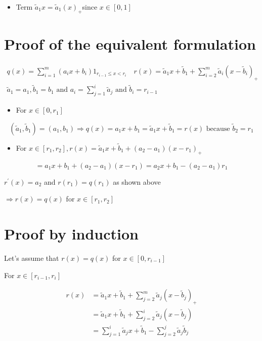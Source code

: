 \documentclass[10pt]{article}
\begin{document}
\begin{itemize}
  \item Term $\tilde{a}_{1} x=\tilde{a}_{1}(x)_{+}$since $x \in[0,1]$
\end{itemize}

\section*{Proof of the equivalent formulation}
$$
\begin{gathered}
q(x)=\sum_{i=1}^{m}\left(a_{i} x+b_{i}\right) 1_{r_{i-1} \leq x<r_{i}} \quad r(x)=\tilde{a}_{1} x+\tilde{b}_{1}+\sum_{i=2}^{m} \tilde{a}_{i}\left(x-\tilde{b}_{i}\right)_{+} \\
\tilde{a}_{1}=a_{1}, \tilde{b}_{1}=b_{1} \text { and } a_{i}=\sum_{j=1}^{i} \tilde{a}_{j} \text { and } \tilde{b}_{i}=r_{i-1}
\end{gathered}
$$

\begin{itemize}
  \item For $x \in\left[0, r_{1}\right]$
\end{itemize}

$$
\left(\tilde{a}_{1}, \tilde{b}_{1}\right)=\left(a_{1}, b_{1}\right) \Longrightarrow q(x)=a_{1} x+b_{1}=\tilde{a}_{1} x+\tilde{b}_{1}=r(x) \text { because } \tilde{b}_{2}=r_{1}
$$

\begin{itemize}
  \item For $x \in\left[r_{1}, r_{2}\right], r(x)=\tilde{a}_{1} x+\tilde{b}_{1}+\left(a_{2}-a_{1}\right)\left(x-r_{1}\right)_{+}$
\end{itemize}

$$
=a_{1} x+b_{1}+\left(a_{2}-a_{1}\right)\left(x-r_{1}\right)=a_{2} x+b_{1}-\left(a_{2}-a_{1}\right) r_{1}
$$

$r^{\prime}(x)=a_{2}$ and $r\left(r_{1}\right)=q\left(r_{1}\right)$ as shown above

$\Longrightarrow r(x)=q(x)$ for $x \in\left[r_{1}, r_{2}\right]$

\section*{Proof by induction}
Let's assume that $r(x)=q(x)$ for $x \in\left[0, r_{i-1}\right]$

For $x \in\left[r_{i-1}, r_{i}\right]$

$$
\begin{aligned}
r(x) & =\tilde{a}_{1} x+\tilde{b}_{1}+\sum_{j=2}^{m} \tilde{a}_{j}\left(x-\tilde{b}_{j}\right)_{+} \\
& =\tilde{a}_{1} x+\tilde{b}_{1}+\sum_{j=2}^{i} \tilde{a}_{j}\left(x-\tilde{b}_{j}\right) \\
& =\sum_{j=1}^{i} \tilde{a}_{j} x+\tilde{b}_{1}-\sum_{j=2}^{j} \tilde{a}_{j} \tilde{b}_{j}
\end{aligned}
$$
\end{document}
